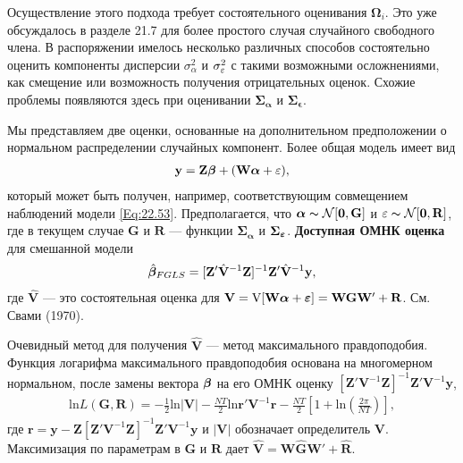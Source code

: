 Осуществление этого подхода требует состоятельного оценивания $\bm\Omega_i$. Это уже обсуждалось в разделе 21.7 для более простого случая случайного свободного члена. В распоряжении имелось несколько различных способов состоятельно оценить компоненты дисперсии $\sigma^2_{\alpha}$ и $\sigma^2_{\varepsilon}$ с такими возможными осложнениями, как смещение или возможность получения отрицательных оценок. Схожие проблемы появляются здесь при оценивании $\bm\Sigma_{\bm\alpha}$ и $\bm\Sigma_{\bm\epsilon}$.

Мы представляем две оценки, основанные на дополнительном предположении о нормальном распределении случайных компонент. Более общая модель имеет вид 
\begin{align}
\mathbf y= \mathbf Z \bm{\beta} + (\mathbf W \bm\alpha + \varepsilon),
\label{Eq:22.55}
\end{align}
который может быть получен, например, соответствующим совмещением наблюдений модели \ref{Eq:22.53}. Предполагается, что $\bm\alpha \thicksim \mathcal N [\mathbf 0, \mathbf G]$ и  $\varepsilon \thicksim \mathcal N[\mathbf 0, \mathbf R]$, где в текущем случае $\mathbf G$ и $\mathbf R$  --- функции $\bm\Sigma_{\bm\alpha}$ и $\bm\Sigma_{\bm{\varepsilon}}$. \textbf{Доступная ОМНК оценка} для смешанной модели
\begin{align}
\hat{\bm{\beta}}_{FGLS}=[\mathbf Z' \hat{\mathbf V}^{-1} \mathbf Z]^{-1}
\mathbf Z' \hat{\mathbf V}^{-1} \mathbf y,
\nonumber
\end{align}
где $\hat{\mathbf V}$ --- это состоятельная оценка для $\mathbf V=\mathrm V[\mathbf W \bm\alpha +\bm{\varepsilon}]=\mathbf W \mathbf G \mathbf W' + \mathbf R$. См. Свами (1970).

Очевидный метод для получения $\hat{\mathbf V}$ --- метод максимального правдоподобия. Функция логарифма максимального правдоподобия основана на многомерном нормальном, после замены вектора $\bm{\beta}$ на его ОМНК оценку $[\mathbf Z' \mathbf V^{-1} \mathbf Z]^{-1} \mathbf Z' \mathbf V^{-1} \mathbf y$,
\begin{align}
\mathrm{ln} L(\mathbf G, \mathbf R)=-\frac{1}{2} \mathrm{ln}|\mathbf V| - \frac{NT}{2} \mathrm{ln} \mathbf r' \mathbf V^{-1} \mathbf r - \frac{NT}{2} \left[ 1+ \mathrm{ln}(\frac{2\pi}{NT})\right],
\nonumber
\end{align}
где $\mathbf r= \mathbf y - \mathbf Z[\mathbf Z'\mathbf V^{-1} \mathbf Z]^{-1} \mathbf Z' \mathbf V^{-1} \mathbf y$ и $|\mathbf V|$ обозначает определитель $\mathbf V$. Максимизация по параметрам в $\mathbf G$ и $\mathbf R$ дает $\hat{\mathbf V}=\mathbf W \hat{\mathbf G} \mathbf W' + \hat{\mathbf R}$.


